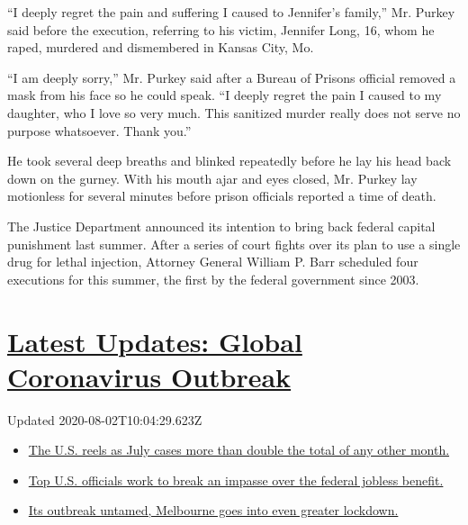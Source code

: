 ``I deeply regret the pain and suffering I caused to Jennifer's
family,'' Mr. Purkey said before the execution, referring to his victim,
Jennifer Long, 16, whom he raped, murdered and dismembered in Kansas
City, Mo.

``I am deeply sorry,'' Mr. Purkey said after a Bureau of Prisons
official removed a mask from his face so he could speak. ``I deeply
regret the pain I caused to my daughter, who I love so very much. This
sanitized murder really does not serve no purpose whatsoever. Thank
you.''

He took several deep breaths and blinked repeatedly before he lay his
head back down on the gurney. With his mouth ajar and eyes closed, Mr.
Purkey lay motionless for several minutes before prison officials
reported a time of death.

The Justice Department announced its intention to bring back federal
capital punishment last summer. After a series of court fights over its
plan to use a single drug for lethal injection, Attorney General William
P. Barr scheduled four executions for this summer, the first by the
federal government since 2003.

\hypertarget{latest-updates-global-coronavirus-outbreak}{%
\section{\texorpdfstring{\href{https://www.nytimes.com/2020/08/01/world/coronavirus-covid-19.html?action=click\&pgtype=Article\&state=default\&region=MAIN_CONTENT_1\&context=storylines_live_updates}{Latest
Updates: Global Coronavirus
Outbreak}}{Latest Updates: Global Coronavirus Outbreak}}\label{latest-updates-global-coronavirus-outbreak}}

Updated 2020-08-02T10:04:29.623Z

\begin{itemize}
\tightlist
\item
  \href{https://www.nytimes.com/2020/08/01/world/coronavirus-covid-19.html?action=click\&pgtype=Article\&state=default\&region=MAIN_CONTENT_1\&context=storylines_live_updates\#link-34047410}{The
  U.S. reels as July cases more than double the total of any other
  month.}
\item
  \href{https://www.nytimes.com/2020/08/01/world/coronavirus-covid-19.html?action=click\&pgtype=Article\&state=default\&region=MAIN_CONTENT_1\&context=storylines_live_updates\#link-780ec966}{Top
  U.S. officials work to break an impasse over the federal jobless
  benefit.}
\item
  \href{https://www.nytimes.com/2020/08/01/world/coronavirus-covid-19.html?action=click\&pgtype=Article\&state=default\&region=MAIN_CONTENT_1\&context=storylines_live_updates\#link-2bc8948}{Its
  outbreak untamed, Melbourne goes into even greater lockdown.}
\end{itemize}

